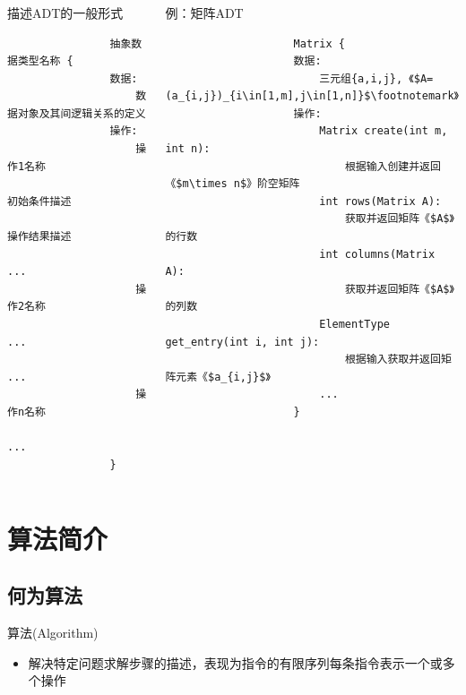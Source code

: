 \begin{fragile}
	\frametitle{\insertsubsectionhead}
	\begin{columns}
		\begin{block}{描述ADT的一般形式}
			\begin{verbatim}
                抽象数据类型名称 {
                数据:
                    数据对象及其间逻辑关系的定义
                操作:
                    操作1名称
                        初始条件描述
                        操作结果描述
                        ...
                    操作2名称
                        ...
                    ...
                    操作n名称
                        ...
                }
            \end{verbatim}
		\end{block}
		\pause
		\begin{exampleblock}{例：矩阵ADT}
			\begin{verbatim}
                    Matrix {
                    数据:
                        三元组{a,i,j}, 《$A=(a_{i,j})_{i\in[1,m],j\in[1,n]}$\footnotemark》
                    操作:
                        Matrix create(int m, int n):
                            根据输入创建并返回《$m\times n$》阶空矩阵
                        int rows(Matrix A):
                            获取并返回矩阵《$A$》的行数
                        int columns(Matrix A):
                            获取并返回矩阵《$A$》的列数
                        ElementType get_entry(int i, int j):
                            根据输入获取并返回矩阵元素《$a_{i,j}$》
                        ...
                    }
                \end{verbatim}
		\end{exampleblock}
	\end{columns}
\end{fragile}

\section{算法简介}

\subsection{何为算法}

\begin{frame}{\insertsubsectionhead}
	\begin{block}{算法(Algorithm)}
		\begin{itemize}
			\item 解决特定问题求解步骤的描述，表现为指令的有限序列每条指令表示一个或多个操作
		\end{itemize}
	\end{block}
\end{frame}

